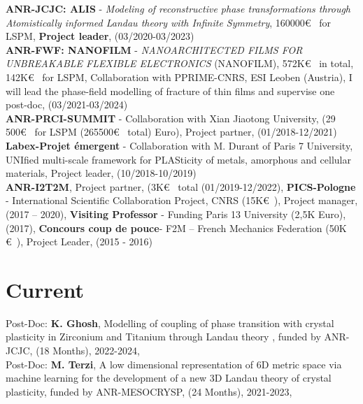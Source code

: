 \documentclass[paper=a4,fontsize=11pt]{temp} %
\begin{document}
 \textbf{ANR-JCJC: ALIS} - \textit{Modeling of reconstructive phase transformations through Atomistically informed Landau theory with Infinite Symmetry}, 160000\euro~ for LSPM, \textbf{Project leader}, (03/2020-03/2023)\\
 
 \textbf{ANR-FWF: NANOFILM} - \textit{NANOARCHITECTED FILMS FOR UNBREAKABLE FLEXIBLE ELECTRONICS} (NANOFILM), 572K\euro~ in total, 142K\euro~ for  LSPM, Collaboration with PPRIME-CNRS, ESI Leoben (Austria), I will lead the phase-field modelling of fracture of thin films and supervise one post-doc, (03/2021-03/2024)\\
 
 \textbf{ANR-PRCI-SUMMIT} - Collaboration with Xian Jiaotong University, (29 500\euro~ for LSPM (265500\euro~  total)
 Euro), Project partner, (01/2018-12/2021)\\

 \textbf{Labex-Projet émergent} - Collaboration with M. Durant of Paris 7 University, UNIfied multi-scale framework for PLASticity of metals, amorphous and cellular materials, Project leader, (10/2018-10/2019)\\
 \textbf{ANR-I2T2M}, Project partner, (3K\euro~  total (01/2019-12/2022), \textbf{PICS-Pologne} - International Scientific Collaboration Project, CNRS (15K\euro~), Project manager, (2017 – 2020), \textbf{Visiting Professor }- Funding Paris 13 University (2,5K Euro), (2017), \textbf{Concours coup de pouce}- F2M – French Mechanics Federation (50K \euro~), Project Leader, (2015 - 2016)


%
%

\section*{Current}
\hspace{3mm}
Post-Doc: \textbf{K. Ghosh}, Modelling of coupling of phase transition with crystal plasticity in Zirconium and Titanium through Landau theory ,
funded by ANR-JCJC, (18 Months), 2022-2024,\\

Post-Doc: \textbf{M. Terzi},  A low dimensional representation of 6D metric space via machine learning for the development of a new 3D Landau theory of crystal plasticity,
funded by ANR-MESOCRYSP, (24 Months), 2021-2023,\\
\end{document}

